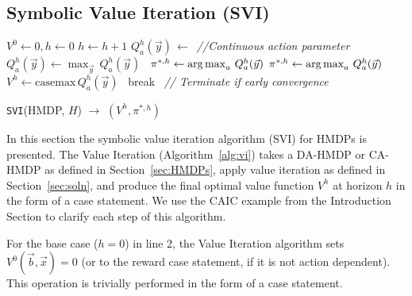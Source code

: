 \documentclass[twoside,11pt]{article}
\def\argmax{\operatornamewithlimits{arg\max}}
\newcommand{\casemax}{\mathrm{casemax}}
\begin{document}
\subsection{Symbolic Value Iteration (SVI)}

\incmargin{.5em}
\linesnumbered
\begin{algorithm}[t!]
\dontprintsemicolon
{}
\Begin
{
   $V^0 \leftarrow 0, h\leftarrow 0$\;
   {
       $h\leftarrow h+1$\;
       {
              $Q_a^{h}(\vec{y})\,\leftarrow \,$\;
			  \emph{//Continuous action parameter}\;
               {
               $Q_a^{h}(\vec{y}) \leftarrow \max_{\vec{y}} \, Q_a^{h}(\vec{y})$ $\,$ \;
               $\pi^{*,h} \leftarrow \argmax_{a} \, Q_a^{h}(\vec{y})$\;
               } 
               \Else 
               { $\pi^{*,h} \leftarrow \argmax_{a} \, Q_a^{h}(\vec{y})$ \; }
        }
       $V^{h} \leftarrow \casemax \, Q_a^{h}(\vec{y})$ $\,$ \;
           {break $\,$ \emph{// Terminate if early convergence}\;}
   }
      \;
}
\caption{\footnotesize \texttt{SVI}(HMDP, $H$) $\longrightarrow$ $(V^h,\pi^{*,h})$ \label{alg:vi}}
\end{algorithm}
\decmargin{.5em}
In this section the symbolic value iteration algorithm (SVI) for HMDPs is presented. The Value Iteration  (Algorithm~\ref{alg:vi}) takes a DA-HMDP or CA-HMDP as defined in Section~\ref{sec:HMDPs}, apply value
iteration as defined in Section~\ref{sec:soln}, and produce
the final optimal value function $V^h$ at horizon $h$ in the form
of a case statement. 
We use the \textsc{CAIC} example from the Introduction Section to clarify each step of this algorithm. 

For the base case ($h=0$) in line 2, the Value Iteration algorithm sets $V^0(\vec{b},\vec{x}) = 0$
(or to the reward case statement, if it is not action dependent). This operation
is trivially performed in the form of a case statement.
\end{document}
